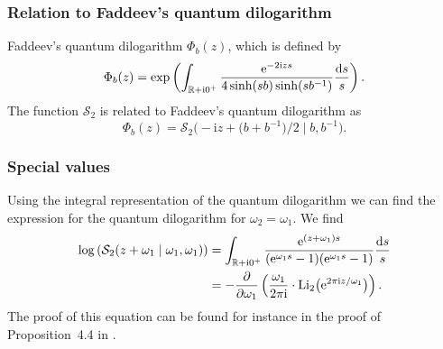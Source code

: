 \documentclass[pdftex]{sigma}
\numberwithin{equation}{section}
\begin{document}
\subsubsection{Relation to Faddeev's quantum dilogarithm}

Faddeev's quantum dilogarithm $\Phi_{b}(z)$, which is defined by
\begin{equation*}
 \Phi_b(z)= \exp \left( \int_{\mathbb{R}+ \mathrm{i} 0^{+}} \frac{{\rm e}^{-2 \mathrm{i} z s}}{4 \sinh(sb) \sinh(sb^{-1})} \frac{{\rm d}s}{s}\right).
\end{equation*}
The function $\mathcal{S}_2$ is related to Faddeev's quantum dilogarithm
as
\begin{equation*}
\Phi_b(z)= \mathcal{S}_2\bigl(-\mathrm{i} z + \big(b+b^{-1}\big)/2\mid b,b^{-1}\bigr).
\end{equation*}


\subsubsection{Special values}

Using the integral representation of the quantum dilogarithm we can find the expression for the quantum dilogarithm for $\omega_2=\omega_1$. We find
\begin{align}
\log\left(\mathcal{S}_2(z+\omega_1\mid \omega_1,\omega_1)\right) &= \int_{\mathbb{R}+\mathrm{i} 0^{+}} \frac{{\rm e}^{(z+\omega_1)s}}{({\rm e}^{\omega_1s}-1)({\rm e}^{\omega_1 s}-1)} \frac{{\rm d}s}{s}\nonumber \\
&= - \frac{\partial}{\partial \omega_1} \left(\frac{\omega_1}{2\pi \mathrm{i}} \cdot {\rm Li}_2\big({\rm e}^{2\pi \mathrm{i} z/\omega_1}\big) \right).\label{eq:qdilogrepeat}
\end{align}
The proof of this equation can be found for instance in the proof of Proposition~4.4 in \cite{BridgelandCon}.
\end{document}
